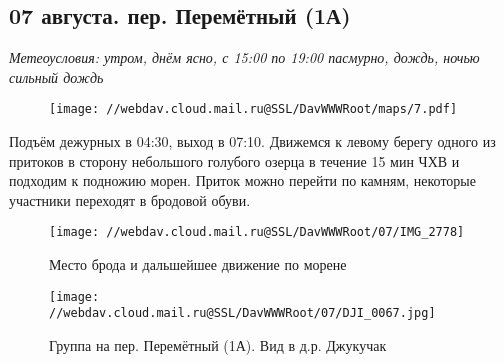 \subsection{07 августа. пер. Перемётный (1А)}
\textit{Метеоусловия: утром, днём ясно, с 15:00 по 19:00 пасмурно, дождь, ночью сильный дождь}

\begin{figure}[h!]
	\centering
	\texttt{[image: //webdav.cloud.mail.ru@SSL/DavWWWRoot/maps/7.pdf]}
	\label{fig:mini_18}
\end{figure}

Подъём дежурных в 04:30, выход в 07:10. Движемся к левому берегу одного из притоков в сторону небольшого голубого озерца в течение 15 мин ЧХВ и подходим к подножию морен. Приток можно перейти по камням, некоторые участники переходят в бродовой обуви.

\begin{figure}[h!]
	\centering
	\texttt{[image: //webdav.cloud.mail.ru@SSL/DavWWWRoot/07/IMG\_2778]}
	\caption{Место брода и дальшейшее движение по морене}
	\label{fig:img2778}
\end{figure}

\begin{figure}[h!]
	\centering
	\texttt{[image: //webdav.cloud.mail.ru@SSL/DavWWWRoot/07/DJI\_0067.jpg]}
	\caption{Группа на пер. Перемётный (1А). Вид в д.р. Джукучак}
	\label{fig:DJI_0067.jpg}
\end{figure}


\clearpage